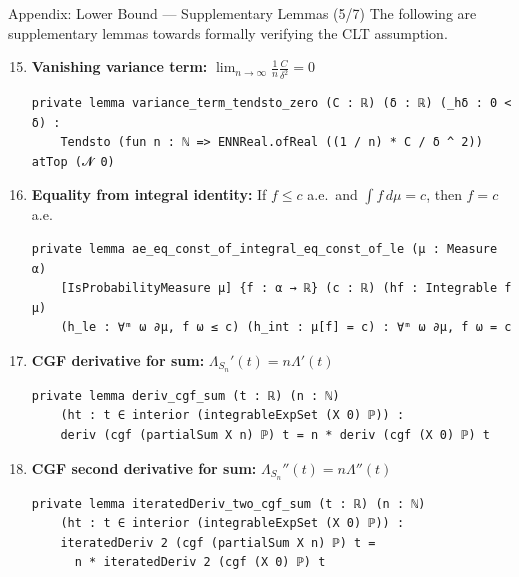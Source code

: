 \documentclass[aspectratio=169]{beamer}
\begin{document}
\begin{frame}[fragile]{Appendix: Lower Bound --- Supplementary Lemmas (5/7)}
  {\small The following are supplementary lemmas towards formally verifying the CLT assumption.}
  \begin{enumerate}\setcounter{enumi}{14}
    \item \textbf{Vanishing variance term:} $\lim_{n\to\infty} \frac{1}{n}\frac{C}{\delta^2} = 0$
\begin{lstlisting}[basicstyle=\ttfamily\tiny]
private lemma variance_term_tendsto_zero (C : ℝ) (δ : ℝ) (_hδ : 0 < δ) :
    Tendsto (fun n : ℕ => ENNReal.ofReal ((1 / n) * C / δ ^ 2)) atTop (𝓝 0)
\end{lstlisting}
    \item \textbf{Equality from integral identity:} If $f \le c$ a.e.\ and $\int f\, d\mu = c$, then $f = c$ a.e.
\begin{lstlisting}[basicstyle=\ttfamily\tiny]
private lemma ae_eq_const_of_integral_eq_const_of_le (μ : Measure α)
    [IsProbabilityMeasure μ] {f : α → ℝ} (c : ℝ) (hf : Integrable f μ)
    (h_le : ∀ᵐ ω ∂μ, f ω ≤ c) (h_int : μ[f] = c) : ∀ᵐ ω ∂μ, f ω = c
\end{lstlisting}
    \item \textbf{CGF derivative for sum:} $\Lambda_{S_n}'(t) = n\Lambda'(t)$
\begin{lstlisting}[basicstyle=\ttfamily\tiny]
private lemma deriv_cgf_sum (t : ℝ) (n : ℕ)
    (ht : t ∈ interior (integrableExpSet (X 0) ℙ)) :
    deriv (cgf (partialSum X n) ℙ) t = n * deriv (cgf (X 0) ℙ) t
\end{lstlisting}
    \item \textbf{CGF second derivative for sum:} $\Lambda_{S_n}''(t) = n\Lambda''(t)$
\begin{lstlisting}[basicstyle=\ttfamily\tiny]
private lemma iteratedDeriv_two_cgf_sum (t : ℝ) (n : ℕ)
    (ht : t ∈ interior (integrableExpSet (X 0) ℙ)) :
    iteratedDeriv 2 (cgf (partialSum X n) ℙ) t =
      n * iteratedDeriv 2 (cgf (X 0) ℙ) t
\end{lstlisting}
  \end{enumerate}
\end{frame}
\end{document}
